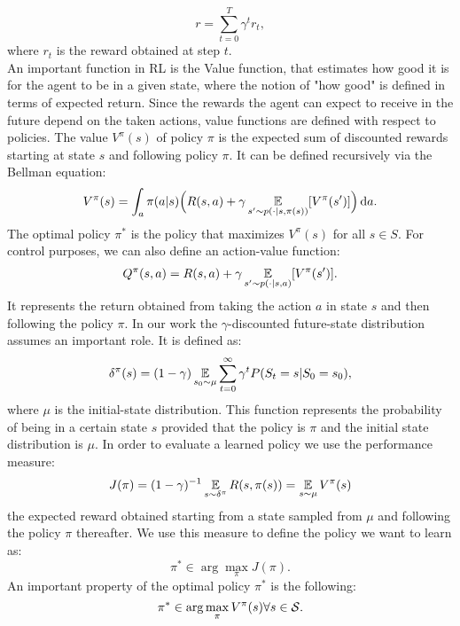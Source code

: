 $$r = \sum_{t=0}^{T} \gamma^t r_t, $$where $r_t$ is the reward obtained at step $t$.\\
\newline
An important function in \ac{RL} is the Value function, that estimates how good it is for the agent to be in a given state, where the notion of "how good" is defined in terms of expected return. Since the rewards the agent can expect to receive in the future depend on the taken actions, value functions are defined with respect to policies. The value $V^{\pi}(s)$ of policy $\pi$ is the expected sum of discounted rewards starting at state $s$ and following policy $\pi$. It can be defined recursively via the Bellman equation: $$V^{\pi}(s) = \int_a \pi(a|s) \Big(R(s,a) + \gamma\operatorname*{\mathbb{E}}_{s'\sim p(\cdot|s,\pi(s))}[V^{\pi}(s')] \Big) \,\mathrm{d} a.$$
The optimal policy $\pi^*$ is the policy that maximizes $V^{\pi}(s)$ for all $s \in S$. For control purposes, we can also define an action-value function: $$Q^{\pi}(s,a) = R(s,a) + \gamma\operatorname*{\mathbb{E}}_{s'\sim p(\cdot|s,a)}[V^{\pi}(s')].$$
It represents the return obtained from taking the action $a$ in state $s$ and then following the policy $\pi$. 
In our work the $\gamma$-discounted future-state distribution assumes an important role. It is defined as:
$$\delta^{\pi}(s) = (1 - \gamma)\operatorname*{\mathbb{E}}_{s_{0}\sim\mu}\sum_{t=0}^{\infty}\gamma^t P(S_t = s|S_0=s_0),$$
where $\mu$ is the initial-state distribution. This function represents the probability of being in a certain state $s$ provided that the policy is $\pi$ and the initial state distribution is $\mu$.
In order to evaluate a learned policy we use the performance measure:
$${J(\pi) = (1 - \gamma)^{-1}\operatorname*{\mathbb{E}}_{s\sim\delta^{\pi}}R(s,\pi(s))} = \operatorname*{\mathbb{E}}_{s\sim\mu}V^{\pi}(s)$$
\ie the expected reward obtained starting from a state sampled from $\mu$ and following the policy $\pi$ thereafter. We use this measure to define the policy we want to learn as:
$$ \pi^{*} \in \arg \max_{\pi} J(\pi).$$
An important property of the optimal policy $\pi^{*}$ is the following:
$$ \pi^{*} \in \arg \max_{\pi} V^{\pi}(s) \forall s \in \mathcal{S}.$$

